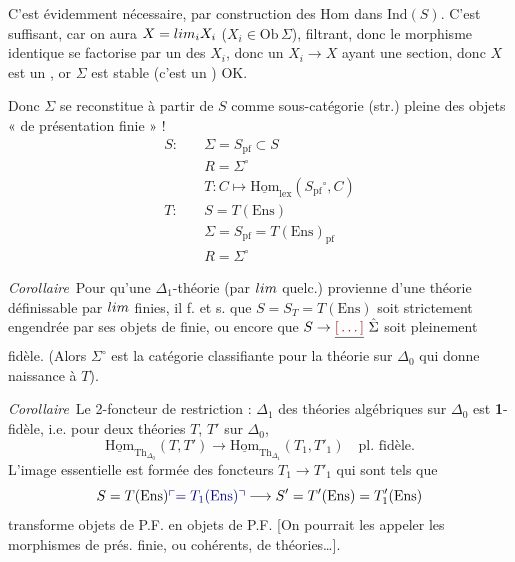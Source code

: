 \documentclass[11pt,a4paper]{article}
\begin{document}
    C'est évidemment nécessaire, par construction des Hom dans
    $\mathrm{Ind}(S)$. C'est suffisant, car  on
    aura $X = \varinjlim_{i} X_{i}$ ($X_{i} \in \mathrm{Ob}\,\Sigma$),
    filtrant, donc le morphisme identique se factorise
    par un des $X_{i}$, donc  un $X_{i} \to X$ ayant une section,
    donc $X$ est un 
     , or $\Sigma$ est
     stable  (c'est un
    ) 
    OK.

Donc $\Sigma$ se reconstitue à partir de $S$ comme  sous-catégorie (str.) pleine des objets « de présentation
finie » !
\begin{align*}
  S :\quad & \Sigma = S_{\mathrm{pf}} \subset S \\
  & R = \Sigma^{\circ} \\
  & T : C \mapsto \underline{\mathrm{Hom}}_{\mathrm{lex}}
    (S_{\mathrm{pf}}{}^{\circ}, C) \\
  T :\quad & S = T(\mathrm{Ens}) \\
  & \Sigma = S_{\mathrm{pf}} = T(\mathrm{Ens})_{\mathrm{pf}} \\
  & R = \Sigma^{\circ}
\end{align*}

\emph{Corollaire}\ Pour qu'une  $\Delta_{1}$-théorie
 (par $\varprojlim$ quelc.) provienne d'une théorie
définissable par $\varprojlim$ finies, il f. et s. que $S = S_{T} =
T(\mathrm{Ens})$ soit \struck{\ill{}} strictement engendrée par ses
 objets de  finie,
ou encore que $S \to \struck{\ill{}}\ \hat{\Sigma}$ soit pleinement
fidèle. (Alors $\Sigma^{\circ}$ est la catégorie classifiante pour la
théorie sur $\Delta_{0}$ qui donne naissance à $T$).

\emph{Corollaire}\ Le 2-foncteur de restriction : $\Delta_{1}$ des
théories algébriques sur $\Delta_{0}$ est \textbf{1}-fidèle, i.e. pour
\struck{\ill{}} deux théories $T$, $T'$ sur $\Delta_{0}$,
\[
  \underline{\mathrm{Hom}}_{\mathrm{Th}_{\Delta_{0}}}(T, T')
  \longrightarrow \underline{\mathrm{Hom}}_{\mathrm{Th}_{\Delta_{1}}}
  (T_{1}, T'_{1}) \quad \text{pl. fidèle.}
\]
L'image essentielle est formée des foncteurs $T_{1} \to T'_{1}$ qui sont
tels que
\[
  S = T(\mathrm{Ens}) \add{= T_{1}(\mathrm{Ens})} \longrightarrow S' =
  T'(\mathrm{Ens}) = T'_{1}(\mathrm{Ens})
\]
transforme objets de P.F. en objets de P.F. [On pourrait les appeler les
morphismes de prés. finie, ou cohérents, de théories…].
\end{document}

